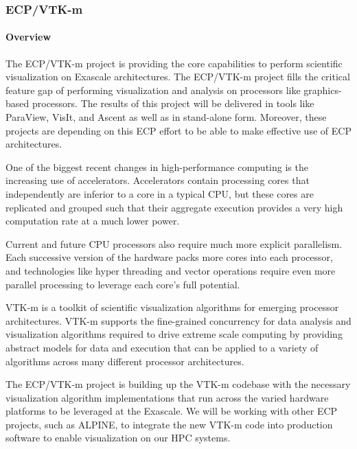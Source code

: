 \subsubsection{ ECP/VTK-m}

\paragraph{Overview}
The ECP/VTK-m project is providing the core capabilities to perform scientific visualization on Exascale architectures.
The ECP/VTK-m project fills the critical feature gap of performing visualization and analysis on processors like graphics-based processors.
The results of this project will be delivered in tools like ParaView, VisIt, and Ascent as well as in stand-alone form.
Moreover, these projects are depending on this ECP effort to be able to make effective use of ECP architectures.

One of the biggest recent changes in high-performance computing is the increasing use of accelerators.
Accelerators contain processing cores that independently are inferior to a core in a typical CPU, but these cores are replicated and grouped such that their aggregate execution provides a very high computation rate at a much lower power.

Current and future CPU processors also require much more explicit parallelism.
Each successive version of the hardware packs more cores into each processor, and technologies like hyper threading and vector operations require even more parallel processing to leverage each core's full potential.

VTK-m is a toolkit of scientific visualization algorithms for emerging processor architectures.
VTK-m supports the fine-grained concurrency for data analysis and visualization algorithms required to drive extreme scale computing by providing abstract models for data and execution that can be applied to a variety of algorithms across many different processor architectures.

The ECP/VTK-m project is building up the VTK-m codebase with the necessary visualization algorithm implementations that run across the varied hardware platforms to be leveraged at the Exascale.
We will be working with other ECP projects, such as ALPINE, to integrate the new VTK-m code into production software to enable visualization on our HPC systems.

